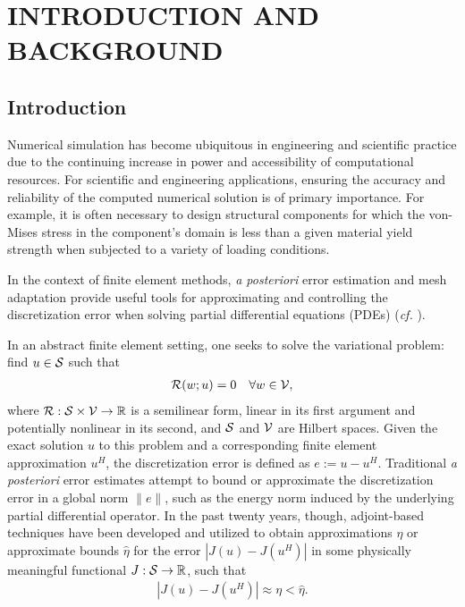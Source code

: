 \chapter{INTRODUCTION AND BACKGROUND}
\label{chap:intro}

\let\thefootnote\relax{}

\section{Introduction}

Numerical simulation has become ubiquitous in engineering and scientific
practice due to the continuing increase in power and accessibility of
computational resources. For scientific and engineering applications, ensuring
the accuracy and reliability of the computed numerical solution is of primary
importance. For example, it is often necessary to design structural components
for which the von-Mises stress in the component's domain is less than a given
material yield strength when subjected to a variety of loading conditions.

In the context of finite element methods, \emph{a posteriori} error estimation
and mesh adaptation provide useful tools for approximating and controlling
the discretization error when solving partial differential equations
(PDEs) (\emph{cf.} \cite{ainsworth2011posteriori, gratsch2005posteriori,
verfurth1994adaptive}).

In an abstract finite element setting, one seeks to solve the variational
problem: find $u \in \S$ such that
%
\begin{gather}
\R(w; u) = 0 \quad \forall w \in \V,
\end{gather}
%
where $\R: \S \times \V \to \mathbb{R}$ is a semilinear form, linear in its
first argument and potentially nonlinear in its second, and $\S$ and
$\V$ are Hilbert spaces. Given the exact solution $u$ to this problem and
a corresponding finite element approximation $u^H$, the discretization error
is defined as $e := u -u^H$. Traditional \emph{a posteriori} error estimates
attempt to bound or approximate the discretization error in a global norm
$\| e \|$, such as the energy norm induced by the underlying partial
differential operator. In the past twenty years, though, adjoint-based
techniques have been developed and utilized to obtain approximations $\eta$
or approximate bounds $\hat{\eta}$ for the error $|J(u) - J(u^H)|$ in some
physically meaningful functional $J : \S \to \mathbb{R}$, such that
%
\begin{gather}
|J(u) - J(u^H)| \approx \eta < \hat{\eta}.
\end{gather}

